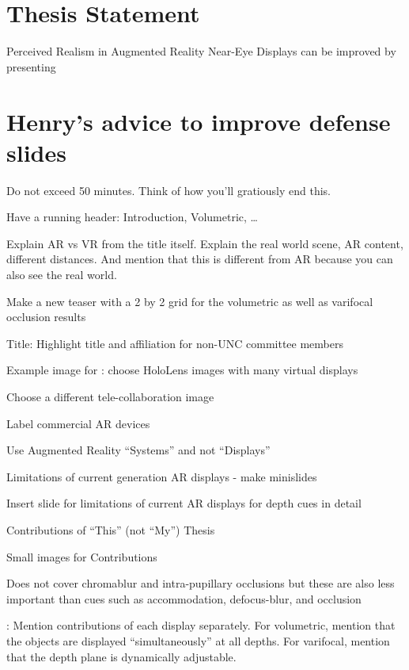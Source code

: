 \section{Thesis Statement}

Perceived Realism in Augmented Reality Near-Eye Displays can be improved by presenting 

\section{Henry's advice to improve defense slides}
\begin{compact_itemize}
\item Do not exceed 50 minutes. Think of how you'll gratiously end this.
\item Have a running header: Introduction, Volumetric, \dots
\item Explain AR vs VR from the title itself. Explain the real world scene, AR content, different distances. And mention that this is different from AR because you can also see the real world. 
\item Make a new teaser with a 2 by 2 grid for the volumetric as well as varifocal occlusion results
\item Title: Highlight title and affiliation for non-UNC committee members
\item Example image for : choose HoloLens images with many virtual displays
\item Choose a different tele-collaboration image
\item Label commercial AR devices
\item Use Augmented Reality ``Systems'' and not ``Displays''
\item Limitations of current generation AR displays - make minislides
\item Insert slide for limitations of current AR displays for depth cues in detail
\item Contributions of ``This'' (not ``My'') Thesis
\item Small images for Contributions
\item Does not cover chromablur and intra-pupillary occlusions but these are also less important than cues such as accommodation, defocus-blur, and occlusion
\item {}: Mention contributions of each display separately. For volumetric, mention that the objects are displayed ``simultaneously'' at all depths. For varifocal, mention that the depth plane is dynamically adjustable.

\end{compact_itemize}
